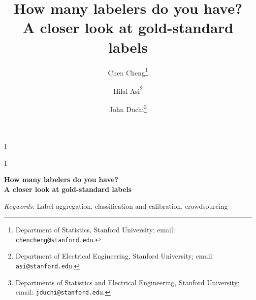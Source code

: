\documentclass[12pt]{article}
\newcommand{\blind}{1}
\begin{document}
%

\def\spacingset#1{\renewcommand{\baselinestretch}%
{#1}\small\normalsize} \spacingset{1}


\blind
{
  \title{\bf How many labelers do you have? \\
  	A closer look at gold-standard labels}
  \author{Chen Cheng\thanks{Department of Statistics, Stanford University; email: \texttt{chencheng@stanford.edu}.} \and
  	Hilal Asi\thanks{Department of Electrical Engineering, Stanford University; email: \texttt{asi@stanford.edu}.}
  	\and
  	John Duchi\thanks{Departments of Statistics and Electrical Engineering, Stanford University; email: \texttt{jduchi@stanford.edu}.}}
  \maketitle
} \fi

\blind
{
  \bigskip
  \bigskip
  \bigskip
  \begin{center}
    {\LARGE\bf How many labelers do you have? \\
    	A closer look at gold-standard labels}
\end{center}
  \medskip
} \fi

\bigskip



\noindent%
{\it Keywords:} Label aggregation, classification and calibration, crowdsourcing
\vfill

\newpage
\spacingset{1.87} %






%



%

\spacingset{1.87}


\end{document}
